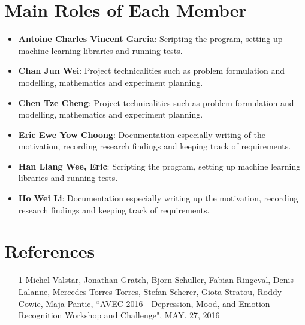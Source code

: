 \documentclass{article}
\begin{document}
	\section{Main Roles of Each Member}
	\begin{itemize}
		\item \textbf{Antoine Charles Vincent Garcia}: 
		Scripting the program, setting up machine learning libraries and running tests.
		\item \textbf{Chan Jun Wei}: 
		Project technicalities such as problem formulation and modelling, mathematics and experiment planning.
		\item \textbf{Chen Tze Cheng}: 
		Project technicalities such as problem formulation and modelling, mathematics and experiment planning.
		\item \textbf{Eric Ewe Yow Choong}: 
		Documentation especially writing of the motivation, recording research findings and keeping track of requirements.
		\item \textbf{Han Liang Wee, Eric}: 
		Scripting the program, setting up machine learning libraries and running tests.
		\item \textbf{Ho Wei Li}: 
		Documentation especially writing up the motivation, recording research findings and keeping track of requirements.
	\end{itemize}
	
	\section{References}
	\begin{itemize}
		\item
		[1] Michel Valstar, Jonathan Gratch, Bjorn Schuller, Fabian Ringeval, Denis Lalanne, Mercedes Torres Torres, Stefan Scherer, Giota Stratou, Roddy Cowie, Maja Pantic, ``AVEC 2016 - Depression, Mood, and Emotion Recognition Workshop and Challenge", MAY. 27, 2016 \\
	\end{itemize}
\end{document}
